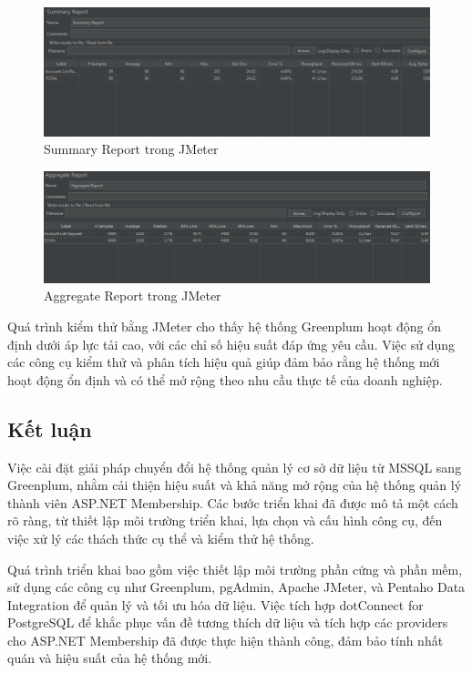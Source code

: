 \documentclass[14pt]{article}
\begin{document}
\begin{figure}
    \centering
    \includegraphics[width=0.8\linewidth]{images/sr.png}
     \caption{Summary Report trong JMeter}
    \label{fig:sr}
\end{figure}

\begin{figure}
    \centering
    \includegraphics[width=0.8\linewidth]{images/ar.png}
    \caption{Aggregate Report trong JMeter}
    \label{fig:ar}
\end{figure}

Quá trình kiểm thử bằng JMeter cho thấy hệ thống Greenplum hoạt động ổn định dưới áp lực tải cao, với các chỉ số hiệu suất đáp ứng yêu cầu. Việc sử dụng các công cụ kiểm thử và phân tích hiệu quả giúp đảm bảo rằng hệ thống mới hoạt động ổn định và có thể mở rộng theo nhu cầu thực tế của doanh nghiệp.


\subsection{Kết luận}

Việc cài đặt giải pháp chuyển đổi hệ thống quản lý cơ sở dữ liệu từ MSSQL sang Greenplum, nhằm cải thiện hiệu suất và khả năng mở rộng của hệ thống quản lý thành viên ASP.NET Membership. Các bước triển khai đã được mô tả một cách rõ ràng, từ thiết lập môi trường triển khai, lựa chọn và cấu hình công cụ, đến việc xử lý các thách thức cụ thể và kiểm thử hệ thống.

Quá trình triển khai bao gồm việc thiết lập môi trường phần cứng và phần mềm, sử dụng các công cụ như Greenplum, pgAdmin, Apache JMeter, và Pentaho Data Integration để quản lý và tối ưu hóa dữ liệu. Việc tích hợp dotConnect for PostgreSQL để khắc phục vấn đề tương thích dữ liệu và tích hợp các providers cho ASP.NET Membership đã được thực hiện thành công, đảm bảo tính nhất quán và hiệu suất của hệ thống mới.
\end{document}
